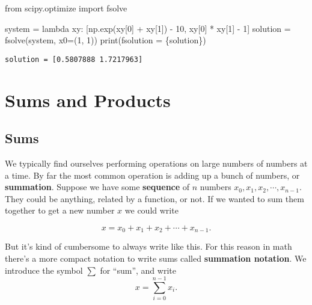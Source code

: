 \documentclass[
  letterpaper,
  DIV=11,
  numbers=noendperiod]{scrreprt}
\newenvironment{Shaded}{\begin{snugshade}}{\end{snugshade}}
\newcommand{\BuiltInTok}[1]{\textcolor[rgb]{0.00,0.23,0.31}{#1}}
\newcommand{\DecValTok}[1]{\textcolor[rgb]{0.68,0.00,0.00}{#1}}
\newcommand{\ImportTok}[1]{\textcolor[rgb]{0.00,0.46,0.62}{#1}}
\newcommand{\KeywordTok}[1]{\textcolor[rgb]{0.00,0.23,0.31}{#1}}
\newcommand{\NormalTok}[1]{\textcolor[rgb]{0.00,0.23,0.31}{#1}}
\newcommand{\OperatorTok}[1]{\textcolor[rgb]{0.37,0.37,0.37}{#1}}
\newcommand{\SpecialCharTok}[1]{\textcolor[rgb]{0.37,0.37,0.37}{#1}}
\newcommand{\SpecialStringTok}[1]{\textcolor[rgb]{0.13,0.47,0.30}{#1}}
\begin{document}
\begin{Shaded}
\begin{Highlighting}[]
\ImportTok{from}\NormalTok{ scipy.optimize }\ImportTok{import}\NormalTok{ fsolve}

\NormalTok{system }\OperatorTok{=} \KeywordTok{lambda}\NormalTok{ xy: [np.exp(xy[}\DecValTok{0}\NormalTok{] }\OperatorTok{+}\NormalTok{ xy[}\DecValTok{1}\NormalTok{]) }\OperatorTok{{-}} \DecValTok{10}\NormalTok{, xy[}\DecValTok{0}\NormalTok{] }\OperatorTok{*}\NormalTok{ xy[}\DecValTok{1}\NormalTok{] }\OperatorTok{{-}} \DecValTok{1}\NormalTok{]}
\NormalTok{solution }\OperatorTok{=}\NormalTok{ fsolve(system, x0}\OperatorTok{=}\NormalTok{(}\DecValTok{1}\NormalTok{, }\DecValTok{1}\NormalTok{))}
\BuiltInTok{print}\NormalTok{(}\SpecialStringTok{f\textquotesingle{}solution = }\SpecialCharTok{\{}\NormalTok{solution}\SpecialCharTok{\}}\SpecialStringTok{\textquotesingle{}}\NormalTok{)}
\end{Highlighting}
\end{Shaded}

\begin{verbatim}
solution = [0.5807888 1.7217963]
\end{verbatim}

\hypertarget{sums-and-products}{%
\section{Sums and Products}\label{sums-and-products}}

\hypertarget{sums}{%
\subsection{Sums}\label{sums}}

We typically find ourselves performing operations on large numbers of
numbers at a time. By far the most common operation is adding up a bunch
of numbers, or \textbf{summation}. Suppose we have some
\textbf{sequence} of \(n\) numbers \(x_0,x_1,x_2,\cdots,x_{n-1}\). They
could be anything, related by a function, or not. If we wanted to sum
them together to get a new number \(x\) we could write

\[x = x_0 + x_1 + x_2 + \cdots + x_{n-1}.\]

But it's kind of cumbersome to always write like this. For this reason
in math there's a more compact notation to write sums called
\textbf{summation notation}. We introduce the symbol \(\sum\) for
``sum'', and write \[x = \sum_{i=0}^{n-1} x_i.\]
\end{document}
